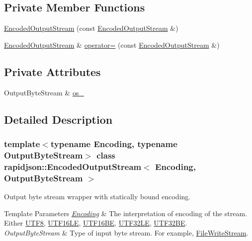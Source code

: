 \subsection*{Private Member Functions}
\begin{DoxyCompactItemize}
\item 
\mbox{\hyperlink{classrapidjson_1_1_encoded_output_stream_aab5dbd6c17b1458d4b468e39b36e5337}{Encoded\+Output\+Stream}} (const \mbox{\hyperlink{classrapidjson_1_1_encoded_output_stream}{Encoded\+Output\+Stream}} \&)
\item 
\mbox{\hyperlink{classrapidjson_1_1_encoded_output_stream}{Encoded\+Output\+Stream}} \& \mbox{\hyperlink{classrapidjson_1_1_encoded_output_stream_a239ae151f2510bc8d2053b228e7b7949}{operator=}} (const \mbox{\hyperlink{classrapidjson_1_1_encoded_output_stream}{Encoded\+Output\+Stream}} \&)
\end{DoxyCompactItemize}
\subsection*{Private Attributes}
\begin{DoxyCompactItemize}
\item 
Output\+Byte\+Stream \& \mbox{\hyperlink{classrapidjson_1_1_encoded_output_stream_a2710097be452d475b96538a16b7fa80a}{os\+\_\+}}
\end{DoxyCompactItemize}


\subsection{Detailed Description}
\subsubsection*{template$<$typename Encoding, typename Output\+Byte\+Stream$>$\newline
class rapidjson\+::\+Encoded\+Output\+Stream$<$ Encoding, Output\+Byte\+Stream $>$}

Output byte stream wrapper with statically bound encoding. 


\begin{DoxyTemplParams}{Template Parameters}
{\em \mbox{\hyperlink{classrapidjson_1_1_encoding}{Encoding}}} & The interpretation of encoding of the stream. Either \mbox{\hyperlink{structrapidjson_1_1_u_t_f8}{U\+T\+F8}}, \mbox{\hyperlink{structrapidjson_1_1_u_t_f16_l_e}{U\+T\+F16\+LE}}, \mbox{\hyperlink{structrapidjson_1_1_u_t_f16_b_e}{U\+T\+F16\+BE}}, \mbox{\hyperlink{structrapidjson_1_1_u_t_f32_l_e}{U\+T\+F32\+LE}}, \mbox{\hyperlink{structrapidjson_1_1_u_t_f32_b_e}{U\+T\+F32\+BE}}. \\
\hline
{\em Output\+Byte\+Stream} & Type of input byte stream. For example, \mbox{\hyperlink{classrapidjson_1_1_file_write_stream}{File\+Write\+Stream}}. \\
\hline
\end{DoxyTemplParams}


